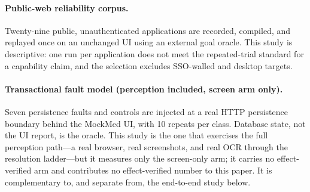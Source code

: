 \paragraph{Public-web reliability corpus.}
Twenty-nine public, unauthenticated applications are recorded, compiled, and
replayed once on an unchanged UI using an external goal oracle. This study is
descriptive: one run per application does not meet the repeated-trial standard
for a capability claim, and the selection excludes SSO-walled and desktop
targets.

\paragraph{Transactional fault model (perception included, screen arm only).}
Seven persistence faults and controls are injected at a real HTTP persistence
boundary behind the MockMed UI, with 10 repeats per class. Database state, not
the UI report, is the oracle. This study is the one that exercises the full
perception path---a real browser, real screenshots, and real OCR through the
resolution ladder---but it measures only the screen-only arm; it carries no
effect-verified arm and contributes no effect-verified number to this paper. It
is complementary to, and separate from, the end-to-end study below.

